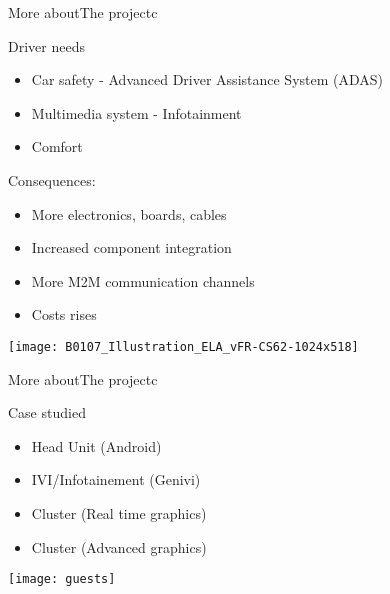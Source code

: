 \documentclass[english,slidetop,9pt,aspectratio=169]{beamer}
\begin{document}
  \begin{myframe}{More about}{The project}{c}
    \begin{minipage}{0.4\textwidth}
      \begin{nbox}{Driver needs}
        \begin{itemize}
        \item Car safety - Advanced Driver Assistance System (ADAS)
        \item Multimedia system - Infotainment
        \item Comfort
        \end{itemize}
      \end{nbox}
      \begin{nbox}{Consequences:}
        \begin{itemize}
        \item More electronics, boards, cables
        \item Increased component integration
        \item More M2M communication channels
        \item Costs rises
        \end{itemize}
      \end{nbox}
    \end{minipage}
    \begin{minipage}{0.59\textwidth}
      \begin{center}
        \texttt{[image: B0107\_Illustration\_ELA\_vFR-CS62-1024x518]}
      \end{center}
    \end{minipage}
  \end{myframe}

  \begin{myframe}{More about}{The project}{c}
    \begin{minipage}{0.4\textwidth}
      \begin{nbox}{Case studied}
        \begin{itemize}
        \item Head Unit (Android)
        \item IVI/Infotainement (Genivi)
        \item Cluster (Real time graphics)
        \item Cluster (Advanced graphics)
        \end{itemize}
      \end{nbox}
    \end{minipage}
    \begin{minipage}{0.59\textwidth}
      \centering
      \texttt{[image: guests]}
    \end{minipage}
  \end{myframe}
\end{document}
